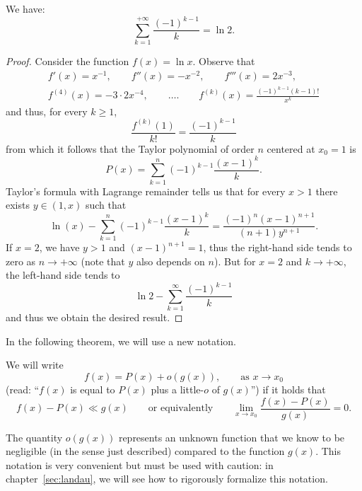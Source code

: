 \begin{example}
We have:
  \[
    \sum_{k=1}^{+\infty} \frac{(-1)^{k-1}}{k} = \ln 2.
  \]
\end{example}
\begin{proof}
Consider the function $f(x) = \ln x$.
Observe that
\begin{gather*}
  f'(x) = x^{-1},\qquad
  f''(x) = -x^{-2},\qquad
  f'''(x) = 2x^{-3}, \\
  f^{(4)}(x) = -3\cdot 2 x^{-4}, \qquad
  \dots. \qquad
  f^{(k)}(x) = \frac{(-1)^{k-1}(k-1)!}{x^k}
\end{gather*}
and thus, for every $k\ge 1$,
\[
  \frac{f^{(k)}(1)}{k!} = \frac{(-1)^{k-1}}{k}
\]
from which it follows that the Taylor polynomial of order $n$
centered at $x_0=1$ is
\[
P(x) = \sum_{k=1}^n (-1)^{k-1}\frac{(x-1)^k}{k}.
\]
Taylor's formula with Lagrange remainder tells us that for
every $x>1$ there exists $y\in(1,x)$ such that
\[
  \ln(x) - \sum_{k=1}^n (-1)^{k-1}\frac{(x-1)^k}{k} 
  = \frac{(-1)^n(x-1)^{n+1}}{(n+1)y^{n+1}}.
\]
If $x=2$, we have $y>1$ and $(x-1)^{n+1}=1$, thus
the right-hand side tends to zero as $n\to +\infty$ 
(note that $y$ also depends on $n$). 
But for $x=2$ and $k\to +\infty$, the left-hand side tends to 
\[
 \ln 2 - \sum_{k=1}^\infty \frac{(-1)^{k-1}}{k}
\]
and thus we obtain the desired result.
\end{proof}

In the following theorem, we will use a new notation. 
\begin{definition}
We will write
%
%
\[
  f(x) = P(x) + o(g(x)), \qquad \text{as $x\to x_0$}
\]
(read: ``$f(x)$ is equal to $P(x)$ plus a little-$o$ of $g(x)$'')
if it holds that
\[
  f(x) - P(x) \ll g(x)
  \qquad\text{or equivalently}\qquad
  \lim_{x\to x_0} \frac{f(x)-P(x)}{g(x)} = 0.
\]
\end{definition}

The quantity $o(g(x))$ represents an unknown function
that we know to be negligible (in the sense just described)
compared to the function $g(x)$.
This notation is very convenient but must be used with caution:
in chapter~\ref{sec:landau}, we will see how to rigorously formalize 
this notation.

